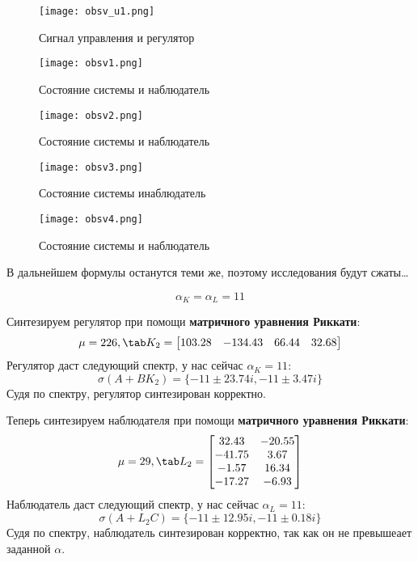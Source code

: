 \newpage
\begin{figure}[ht]
  \centering
  \texttt{[image: obsv\_u1.png]}
  \caption{Сигнал управления и регулятор}
\end{figure}
\begin{figure}[ht]
  \centering
  \texttt{[image: obsv1.png]}
  \caption{Состояние системы и наблюдатель}
\end{figure}
\newpage
\begin{figure}[ht]
  \centering
  \texttt{[image: obsv2.png]}
  \caption{Состояние системы и наблюдатель }
\end{figure}
\begin{figure}[ht]
  \centering
  \texttt{[image: obsv3.png]}
  \caption{Состояние системы инаблюдатель}
\end{figure}
\newpage
\begin{figure}[ht]
  \centering
  \texttt{[image: obsv4.png]}
  \caption{Состояние системы и наблюдатель}
\end{figure}
В дальнейшем формулы останутся теми же, поэтому исследования будут сжаты\dots

\newpage
$$
  \alpha_K = \alpha_L = 11
$$

Синтезируем регулятор при помощи \textbf{матричного уравнения Риккати}:
$$
\mu = 226, \tab K_2 = \begin{bmatrix}
                  103.28 & -134.43  &  66.44 &  32.68
                    \end{bmatrix}
$$
Регулятор даст следующий спектр, у нас сейчас $\alpha_K = 11$:
$$
  \sigma(A+BK_2) =\{ -11 \pm 23.74i, -11 \pm 3.47i \}
$$
Судя по спектру, регулятор синтезирован корректно. 

Теперь синтезируем наблюдателя при помощи \textbf{матричного уравнения Риккати}:
$$
\mu = 29, \tab L_2 = \begin{bmatrix}
                    32.43 &  -20.55 \\
                  -41.75 &    3.67 \\
                    -1.57 &   16.34 \\
                  -17.27 &   -6.93 
                    \end{bmatrix}
$$
Наблюдатель даст следующий спектр, у нас сейчас $\alpha_L = 11$:
$$
  \sigma(A+L_2 C) = \{-11 \pm 12.95i, -11 \pm 0.18i  \}
$$
Судя по спектру, наблюдатель синтезирован корректно, так как он не превышеает заданной $\alpha$.

